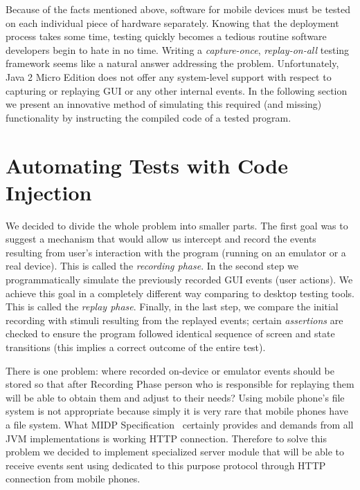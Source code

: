 \documentclass[a4paper,10pt,oneside,final]{dweiss-technote}
\renewcommand{\textsc}[1]{{\scriptsize \MakeUppercase{#1}}}
\begin{document}
Because of the facts mentioned above, software for mobile devices must be tested on each individual
piece of hardware separately. Knowing that the deployment process takes some time, testing quickly
becomes a tedious routine software developers begin to hate in no time. Writing a
\emph{capture-once}, \emph{replay-on-all} testing framework seems like a natural answer addressing
the problem. Unfortunately, Java 2 Micro Edition does not offer any system-level support with
respect to capturing or replaying \textsc{gui} or any other internal events. In the following
section we present an innovative method of simulating this required (and missing) functionality by
instructing the compiled code of a tested program.




\section{Automating Tests with Code Injection}

We decided to divide the whole problem into smaller parts. The first goal was to suggest a mechanism
that would allow us intercept and record the events resulting from user's interaction with the
program (running on an emulator or a real device). This is called the \emph{recording phase}. In the
second step we programmatically simulate the previously recorded \textsc{gui} events (user actions).  
We achieve this goal in a completely different way comparing to desktop testing tools. This is
called the \emph{replay phase}. Finally, in the last step, we compare the initial recording with stimuli 
resulting from the replayed events; certain \emph{assertions} are checked to ensure the program followed
identical sequence of screen and state transitions (this implies a correct outcome of the entire test).

There is one problem: where recorded on-device or emulator events should be stored so that after
Recording Phase person who is responsible for replaying them will be able to obtain them and adjust
to their needs? Using mobile phone's file system is not appropriate because simply it is very rare
that mobile phones have a file system. What MIDP Specification~\cite{midpspec} certainly provides
and demands from all JVM implementations is working HTTP connection. Therefore to solve this problem
we decided to implement specialized server module that will be able to receive events sent using
dedicated to this purpose protocol through HTTP connection from mobile phones.
\end{document}
